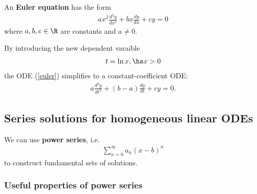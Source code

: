 \documentclass{article}
\begin{document}
\begin{definition}
	An \textbf{Euler equation} has the form
	\begin{align}
		\label{euler}
		ax^2\frac{d^2y}{dx^2} + bx\frac{dy}{dx} + cy = 0
	\end{align}
	where $a,b,c\in\R$ are constants and $a\not=0$.
\end{definition}

\begin{theorem}
	By introducing the new dependent varaible
	\begin{align*}
		t=\ln x,\hs x>0
	\end{align*}
	the ODE (\ref{euler}) simplifies to a constant-coefficient ODE:
	\begin{align*}
		a\frac{d^2y}{dt^2}+(b-a)\frac{dy}{dt}+cy=0.
	\end{align*}
\end{theorem}


\subsection{Series solutions for homogeneous linear ODEs}


\begin{lemma}
	We can use \textbf{power series}, i.e.
	\begin{align}
		\label{pseries}
		\sum_{n=0}^\infty a_n (x-b)^n
	\end{align}
	to construct fundamental sets of solutions.
\end{lemma}

\subsubsection{Useful properties of power series}
\end{document}
